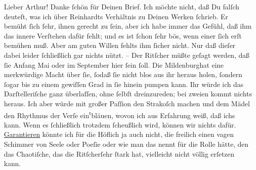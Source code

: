 \pstart\center{}Lieber Arthur!\pend\vspace{0.5em}
\pstart
           Danke{ }ſchön für Deinen Brief. Ich möchte nicht, daß Du falſch deuteſt, was ich über
                  Reinhardts Verhältnis zu Deinen Werken{ }ſchrieb. Er bemüht{ }ſich{ }ſehr, ihnen gerecht zu{ }ſein, aber ich habe immer das Gefühl,
               daß ihm das innere Verſtehen dafür fehlt; und es ist{ }ſchon{ }ſehr bös, wenn einer{ }ſich
               erſt bemühen muß. Aber am guten Willen fehlts ihm{ }ſicher nicht. Nur daß dieſer dabei
               leider{ }ſchließlich gar nichts nützt. – Der Ritſcher müßte geſagt werden, daß{ }ſie Anfang Mai oder im September hier{ }ſein{ }ſoll. Die Mildenburghat eine merkwürdige Macht über{ }ſie,{ }ſodaß{ }ſie
               nicht blos aus ihr heraus holen,{ }ſondern{ }ſogar bis zu einem gewiſſen Grad in{ }ſie
               hinein pumpen kann. Ihr würde ich das Darſtelleriſche ganz überlaſſen, ohne{ }ſelbſt
               dreinzureden; bei zweien kommt nichts heraus. Ich aber würde mit großer Paſſion den
                  Strakoſch machen und dem Mädel den Rhythmus
               der Verſe ein\substVorne{}\textsuperscript{t}\substDazwischen{}b\substHinten{}läuen, wovon ich aus Erfahrung weiß, daß ichs kann. Wenn es{ }ſchließlich
               trotzdem{ }ſcheußlich wird, können wir nichts {\pb}dafür.
                  \uline{Garantieren} könnte ich für die Höflich ja auch nicht, die freilich einen vagen Schimmer von
               Seele oder Poeſie oder wie man das nennt für die Rolle hätte, den das Chaotiſche, das
               die Ritſcherſehr{ }ſtark hat, vielleicht nicht völlig erſetzen
               kann.\pend
           

